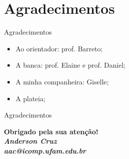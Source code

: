 \documentclass{beamer}
\begin{document}
\section{Agradecimentos}
 \begin{frame}{Agradecimentos}
\begin{itemize}
 \item Ao orientador: prof. Barreto; 
\item A banca: prof. Elaine e prof. Daniel;
\item A minha companheira: Giselle;
\item A plateia;
\end{itemize}

\end{frame}

  \begin{frame}{Agradecimentos}
  \begin{center}
 
  \textcolor{VerdeUFAM}{\Large \textbf{Obrigado pela sua aten\c{c}\~ao!}} \\
  \vspace*{20px}
  \textit{\textbf{Anderson Cruz}} \\
  \textit{\textbf{aac@icomp.ufam.edu.br}}
 
  \end{center}
  \end{frame}

 
 
 
\end{document}
